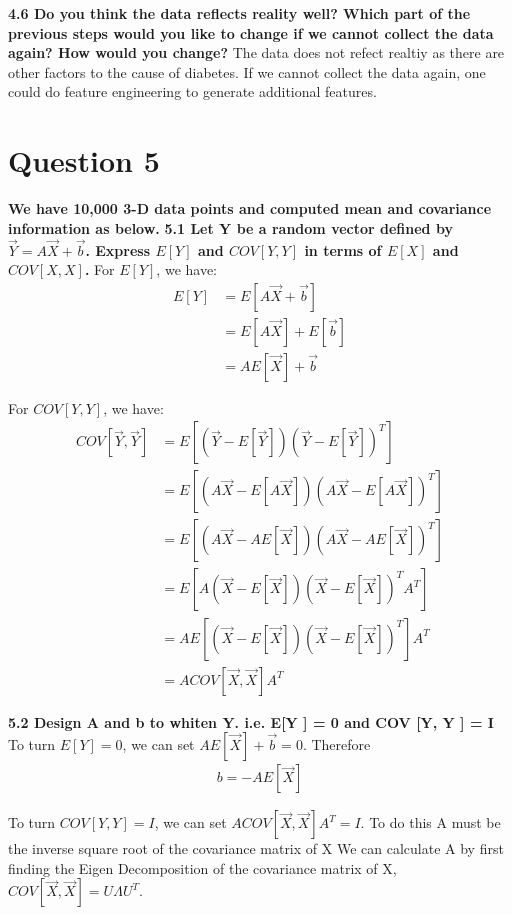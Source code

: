 \documentclass{article}
\begin{document}
\bigbreak
\noindent \textbf{4.6 Do you think the data reflects reality well? Which part of the previous steps would you like
to change if we cannot collect the data again? How would you change?} \newline
The data does not refect realtiy as there are other factors to the cause of diabetes. If we cannot collect the data again, one could do feature engineering to generate additional features.

\section*{Question 5}
\noindent \textbf{We have 10,000 3-D data points and computed mean and covariance information as below.}
\bigbreak
\noindent \textbf{5.1 Let Y be a random vector defined by $\vec{Y} = A\vec{X} + \vec{b}$. Express $E[Y]$ and $COV [Y, Y]$ in terms of $E[X]$ and $COV [X, X]$.} \newline
For $E[Y]$, we have:
\begin{align*}
    E[Y] &= E[A\vec{X} + \vec{b}] \\
    &= E[A\vec{X}] + E[\vec{b}] \\
    &= A E[\vec{X}] + \vec{b}
\end{align*}

For $COV[Y, Y]$, we have:
\begin{align*}
    COV[\vec{Y}, \vec{Y}] &= E\left[(\vec{Y} - E[\vec{Y}])(\vec{Y} - E[\vec{Y}])^T\right]\\
    &= E\left[(A\vec{X} - E[A\vec{X}])(A\vec{X} - E[A\vec{X}])^T\right]\\
    &= E\left[(A\vec{X} - AE[\vec{X}])(A\vec{X} - AE[\vec{X}])^T\right]\\
    &= E\left[A(\vec{X} - E[\vec{X}])(\vec{X} - E[\vec{X}])^TA^T\right]\\
    &= A E\left[(\vec{X} - E[\vec{X}])(\vec{X} - E[\vec{X}])^T\right]A^T\\
    &= A COV[\vec{X}, \vec{X}] A^T
\end{align*}

\bigbreak

\noindent \textbf{5.2 Design A and b to whiten Y. i.e. E[Y ] = 0 and COV [Y, Y ] = I} \newline
To turn $E[Y] = 0$, we can set $A E[\vec{X}] + \vec{b} = 0$. Therefore
\begin{align*}
    b = -A E[\vec{X}]
\end{align*}

\noindent To turn $COV[Y, Y] = I$, we can set $A COV[\vec{X}, \vec{X}] A^T = I$. To do this A must be the inverse square root of the covariance matrix of X
We can calculate A by first finding the Eigen Decomposition of the covariance matrix of X, $COV[\vec{X}, \vec{X}] = U \Lambda U^T$.
\end{document}

